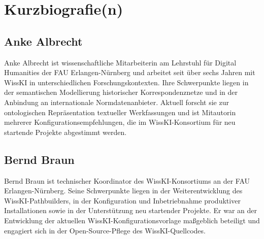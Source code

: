 \section*{Kurzbiografie(n)}

\subsection*{Anke Albrecht}
Anke Albrecht ist wissenschaftliche Mitarbeiterin am Lehrstuhl für Digital Humanities der FAU Erlangen-Nürnberg und arbeitet seit über sechs Jahren mit WissKI in unterschiedlichen Forschungskontexten. Ihre Schwerpunkte liegen in der semantischen Modellierung historischer Korrespondenznetze und in der Anbindung an internationale Normdatenanbieter. Aktuell forscht sie zur ontologischen Repräsentation textueller Werkfassungen und ist Mitautorin mehrerer Konfigurationsempfehlungen, die im WissKI-Konsortium für neu startende Projekte abgestimmt werden.

\subsection*{Bernd Braun}
Bernd Braun ist technischer Koordinator des WissKI-Konsortiums an der FAU Erlangen-Nürnberg. Seine Schwerpunkte liegen in der Weiterentwicklung des WissKI-Pathbuilders, in der Konfiguration und Inbetriebnahme produktiver Installationen sowie in der Unterstützung neu startender Projekte. Er war an der Entwicklung der aktuellen WissKI-Konfigurationsvorlage maßgeblich beteiligt und engagiert sich in der Open-Source-Pflege des WissKI-Quellcodes.
